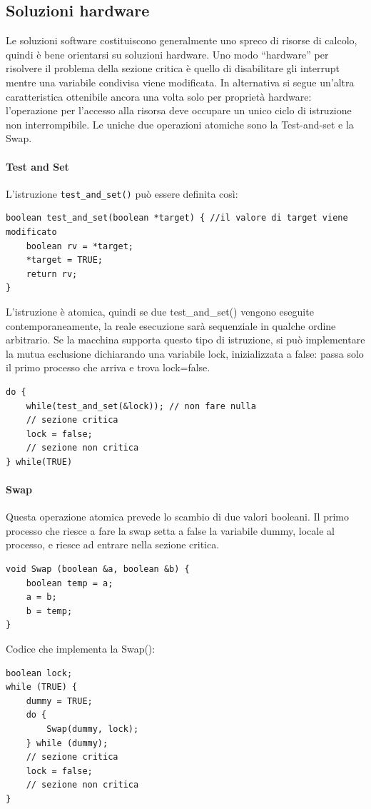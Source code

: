 \documentclass[a4paper]{article}
\begin{document}
\subsection{Soluzioni hardware}
Le soluzioni software costituiscono generalmente uno spreco di risorse di calcolo, quindi è bene orientarsi su soluzioni hardware. Uno modo ``hardware'' per risolvere il problema della sezione critica è quello di disabilitare gli interrupt mentre una variabile condivisa viene modificata. In alternativa si segue un’altra caratteristica ottenibile ancora una volta solo per proprietà hardware: l’operazione per l’accesso alla risorsa deve occupare un unico ciclo di istruzione non interrompibile. Le uniche due operazioni atomiche sono la Test-and-set e la Swap.
\paragraph{Test and Set}
L'istruzione \texttt{test\_and\_set()} può essere definita così:
\begin{verbatim}
boolean test_and_set(boolean *target) { //il valore di target viene modificato
    boolean rv = *target;
    *target = TRUE;
    return rv;
}
\end{verbatim}
L'istruzione è atomica, quindi se due test\_and\_set() vengono eseguite contemporaneamente, la reale esecuzione sarà sequenziale in qualche ordine arbitrario. Se la macchina supporta questo tipo di istruzione, si può implementare la mutua esclusione dichiarando una variabile lock, inizializzata a false: passa solo il primo processo che arriva e trova lock=false.
\begin{verbatim}
do {
    while(test_and_set(&lock)); // non fare nulla
    // sezione critica
    lock = false;
    // sezione non critica
} while(TRUE)
\end{verbatim}

\paragraph{Swap}
Questa operazione atomica prevede lo scambio di due valori booleani. Il primo processo che riesce a fare la swap setta a false la variabile dummy, locale al processo, e riesce ad entrare nella sezione critica.
\begin{verbatim}
void Swap (boolean &a, boolean &b) {
    boolean temp = a;
    a = b;
    b = temp;
}
\end{verbatim}
Codice che implementa la Swap():
\begin{verbatim}
boolean lock;
while (TRUE) {
    dummy = TRUE;
    do {
        Swap(dummy, lock);
    } while (dummy);
    // sezione critica
    lock = false;
    // sezione non critica
}
\end{verbatim}
\end{document}
